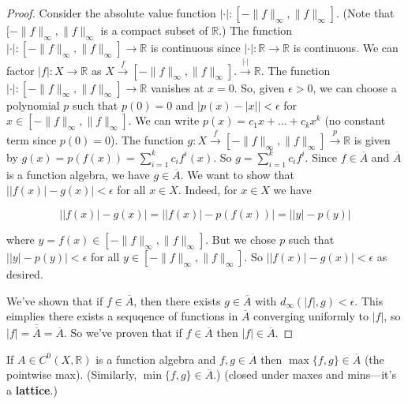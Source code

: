 \begin{proof}

Consider the absolute value function \(|\cdot|: [- \lVert f \rVert_\infty, \lVert f \rVert_\infty] \). (Note that \([- \lVert f \rVert_\infty, \lVert f \rVert_\infty\) is a compact subset of \(\mathbb{R}\).) The function \(|\cdot|: [- \lVert f \rVert_\infty, \lVert f \rVert_\infty]  \to \mathbb{R}\) is continuous since \(| \cdot | : \mathbb{R} \to \mathbb{R}\) is continuous. We can factor \(|f| : X \to \mathbb{R}\) as \(X \xrightarrow{f}  [- \lVert f \rVert_\infty, \lVert f \rVert_\infty]. \xrightarrow{| \cdot|} \mathbb{R}\). The function \(|\cdot|: [- \lVert f \rVert_\infty, \lVert f \rVert_\infty]  \to \mathbb{R}\) vanishes at \(x=0\). So, given \(\epsilon > 0\), we can choose a polynomial \(p\) such that \(p(0) = 0\) and \(|p(x) - |x|| < \epsilon\) for \(x \in  [- \lVert f \rVert_\infty, \lVert f \rVert_\infty] \). We can write \(p(x) = c_1 x + \ldots + c_k x^k\) (no constant term since \(p(0) = 0\)). The function \(g: X \xrightarrow{f}  [- \lVert f \rVert_\infty, \lVert f \rVert_\infty]  \xrightarrow{p} \mathbb{R}\) is given by \(g(x) = p(f(x)) = \sum_{i=1}^k c_i f^i(x)\). So \(g = \sum_{i=1}^k c_i f^i\). Since \(f \in \overline{A}\) and \(\overline{A}\) is a function algebra, we have \(g \in \overline{A}\). We want to show that \(\big| |f(x)| - g(x) \big| < \epsilon\) for all \(x \in X\). Indeed, for \(x \in X\) we have 

\[
\big| |f(x)| - g(x) \big| =  \big| |f(x)| - p(f(x)) \big| =   \big| |y | - p(y) \big| 
\]

where \(y = f(x) \in  [- \lVert f \rVert_\infty, \lVert f \rVert_\infty] \). But we chose \(p\) such that \( \big| |y | - p(y) \big| < \epsilon\) for all \(y \in   [- \lVert f \rVert_\infty, \lVert f \rVert_\infty]  \). So \(   \big| |f(x) | - g(x)  \big| < \epsilon\) as desired.

We've shown that if \(f \in \overline{A}\), then there exists \(g \in \overline{A}\) with \(d_\infty(|f|, g) < \epsilon\). This eimplies there exists a sequqence of functions in \(\overline{A}\) converging uniformly to \(|f|\), so \(|f| = \overline{\overline{A}} = \overline{A}\). So we've proven that if \(f \in \overline{A}\) then \(|f| \in \overline{A}\).

\end{proof}

\begin{corollary}\label{ra.stone.strass.step.2.lem}

If \(A \in C^0(X, \mathbb{R})\) is a function algebra and \(f, g \in \overline{A}\) then \(\max\{f, g\} \in \overline{A}\) (the pointwise max). (Similarly, \(\min\{f,g\} \in \overline{A}\).) (closed under maxes and mins---it's a \textbf{lattice}.)

\end{corollary}

